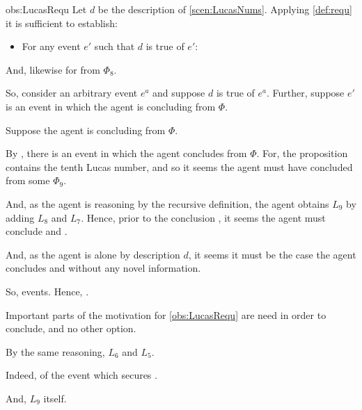 \begin{note}
  \begin{motivation}{obs:LucasRequ}
    Let \(d\) be the description of \autoref{scen:LucasNums}.
    Applying \autoref{def:requ} it is sufficient to establish:

    \begin{itemize}
    \item
      For any event \(e'\) such that \(d\) is true of \(e'\):
    \end{itemize}
    And, likewise for  from \(\Phi_{8}\).

    So, consider an arbitrary event \(e^{a}\) and suppose \(d\) is true of \(e^{a}\).
    Further, suppose \(e'\) is an event in which the agent is concluding  from \(\Phi\).

    Suppose the agent is concluding  from \(\Phi\).

    By \assuPP{}, there is an event in which the agent concludes\newline {} from \(\Phi\).
    For, the proposition contains the tenth Lucas number, and so it seems the agent must have concluded  from some \pool{} \(\Phi_{9}\).

    And, as the agent is reasoning by the recursive definition, the agent obtains \(L_{9}\) by adding \(L_{8}\) and \(L_{7}\).
    Hence, prior to the conclusion , it seems the agent must conclude  and .

    And, as the agent is alone by description \(d\), it seems it must be the case the agent concludes  and  without any novel information.

    So, events.
    Hence, .
  \end{motivation}

  Important parts of the motivation for \autoref{obs:LucasRequ} are need in order to conclude, and no other option.

  By the same reasoning, \(L_{6}\) and \(L_{5}\).

  Indeed,  of the event which secures \fc{}.

  And, \(L_{9}\) itself.
\end{note}

